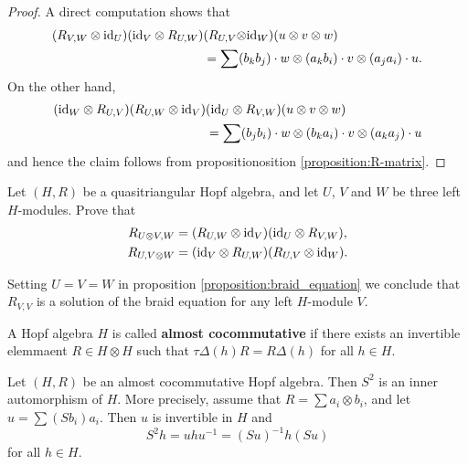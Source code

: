 \begin{proof}
A direct computation shows that
\begin{align*}
(R_{V,W}\otimes\mathrm{id}_{U})(\mathrm{id}_{V}\otimes R_{U,W}) & (R_{U,V}\mathrm{\otimes id}_{W})(u\otimes v\otimes w)\\
 & =\sum(b_{k}b_{j})\cdot w\otimes(a_{k}b_{i})\cdot v\otimes(a_{j}a_{i})\cdot u.
\end{align*}
On the other hand,
\begin{align*}
(\mathrm{id}_{W}\otimes R_{U,V})(R_{U,W}\otimes\mathrm{id}_{V}) & (\mathrm{id}_{U}\otimes R_{V,W})(u\otimes v\otimes w)\\
 & =\sum(b_{j}b_{i})\cdot w\otimes(b_{k}a_{i})\cdot v\otimes(a_{k}a_{j})\cdot u
\end{align*}
and hence the claim follows from propositionosition \ref{proposition:R-matrix}.\end{proof}

\begin{exercise}
\label{exercise:QT_hexagons}
Let $(H,R)$ be a quasitriangular Hopf algebra, and let $U$, $V$ and $W$
be three left $H$-modules. Prove that 
\begin{align}
R_{U\otimes V,W} & =(R_{U,W}\otimes\id_{V})(\id_{U}\otimes R_{V,W}),\label{eq:(Rx1)(1xR)}\\
R_{U,V\otimes W} & =(\id_{V}\otimes R_{U,W})(R_{U,V}\otimes\id_{W}).\label{eq:(1xR)(Rx1)}
\end{align}
\end{exercise}

Setting $U=V=W$ in proposition \ref{proposition:braid_equation} we conclude that
$R_{V,V}$ is a solution of the braid equation for any left $H$-module $V$. 

\begin{definition}
A Hopf algebra $H$ is called \textbf{almost cocommutative} if there exists
an invertible elemmaent $R\in H\otimes H$ such that $\tau\Delta(h)R=R\Delta(h)$
for all $h\in H$.
\end{definition}

\begin{proposition}
Let $(H,R)$ be an almost cocommutative Hopf algebra. Then $S^2$ is an inner
automorphism of $H$. More precisely, assume that $R=\sum a_i\otimes b_i$, and
let $u=\sum (Sb_i)a_i$. Then $u$ is invertible in $H$ and
\[
S^2h=uhu^{-1}=(Su)^{-1}h(Su)
\]
for all $h\in H$.
\end{proposition}

